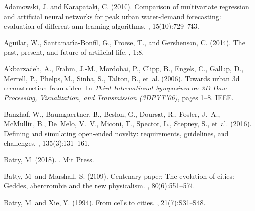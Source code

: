 \documentclass[letterpaper]{article}
\begin{document}


\footnotesize
%

\begin{thebibliography}{}

Adamowski, J. and Karapataki, C. (2010).
\newblock Comparison of multivariate regression and artificial neural networks
  for peak urban water-demand forecasting: evaluation of different ann learning
  algorithms.
, 15(10):729--743.

Aguilar, W., Santamar{\'\i}a-Bonfil, G., Froese, T., and Gershenson, C. (2014).
\newblock The past, present, and future of artificial life.
, 1:8.

Akbarzadeh, A., Frahm, J.-M., Mordohai, P., Clipp, B., Engels, C., Gallup, D.,
  Merrell, P., Phelps, M., Sinha, S., Talton, B., et~al. (2006).
\newblock Towards urban 3d reconstruction from video.
\newblock In {\em Third International Symposium on 3D Data Processing,
  Visualization, and Transmission (3DPVT'06)}, pages 1--8. IEEE.

Banzhaf, W., Baumgaertner, B., Beslon, G., Doursat, R., Foster, J.~A.,
  McMullin, B., De~Melo, V.~V., Miconi, T., Spector, L., Stepney, S., et~al.
  (2016).
\newblock Defining and simulating open-ended novelty: requirements, guidelines,
  and challenges.
, 135(3):131--161.

Batty, M. (2018).
.
\newblock Mit Press.

Batty, M. and Marshall, S. (2009).
\newblock Centenary paper: The evolution of cities: Geddes, abercrombie and the
  new physicalism.
, 80(6):551--574.

Batty, M. and Xie, Y. (1994).
\newblock From cells to cities.
,
  21(7):S31--S48.


\end{thebibliography}
\end{document}
